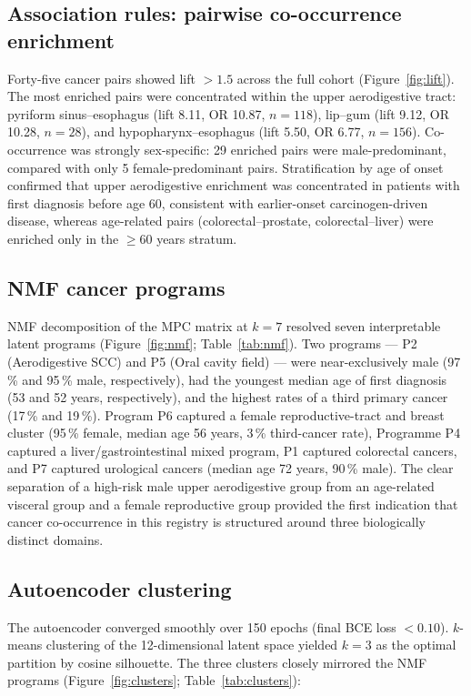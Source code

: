 \documentclass[review,12pt]{elsarticle}
\begin{document}
\subsection{Association rules: pairwise co-occurrence enrichment}
Forty-five cancer pairs showed lift $> 1.5$ across the full cohort
(Figure~\ref{fig:lift}). The most enriched pairs were concentrated within the
upper aerodigestive tract: pyriform sinus--esophagus (lift 8.11, OR 10.87,
$n = 118$), lip--gum (lift 9.12, OR 10.28, $n = 28$), and
hypopharynx--esophagus (lift 5.50, OR 6.77, $n = 156$). Co-occurrence was
strongly sex-specific: 29 enriched pairs were male-predominant, compared with
only 5 female-predominant pairs. Stratification by age of onset confirmed that
upper aerodigestive enrichment was concentrated in patients with first diagnosis
before age 60, consistent with earlier-onset carcinogen-driven disease, whereas
age-related pairs (colorectal--prostate, colorectal--liver) were enriched only
in the $\geq 60$ years stratum.

\subsection{NMF cancer programs}
NMF decomposition of the MPC matrix at $k = 7$ resolved seven interpretable
latent programs (Figure~\ref{fig:nmf}; Table~\ref{tab:nmf}). Two programs ---
P2 (Aerodigestive SCC) and P5 (Oral cavity field) --- were near-exclusively
male (97\,\% and 95\,\% male, respectively), had the youngest median age of
first diagnosis (53 and 52 years, respectively), and the highest rates of a
third primary cancer (17\,\% and 19\,\%). Program P6 captured a female
reproductive-tract and breast cluster (95\,\% female, median age 56 years, 3\,\%
third-cancer rate), Programme P4 captured a liver/gastrointestinal mixed program,
P1 captured colorectal cancers, and P7 captured urological cancers (median
age 72 years, 90\,\% male). The clear separation of a high-risk male
upper aerodigestive group from an age-related visceral group and a female
reproductive group provided the first indication that cancer co-occurrence in
this registry is structured around three biologically distinct domains.

\subsection{Autoencoder clustering}
The autoencoder converged smoothly over 150 epochs (final BCE loss $< 0.10$).
$k$-means clustering of the 12-dimensional latent space yielded $k = 3$ as the
optimal partition by cosine silhouette. The three clusters closely mirrored the
NMF programs (Figure~\ref{fig:clusters}; Table~\ref{tab:clusters}):
\end{document}

